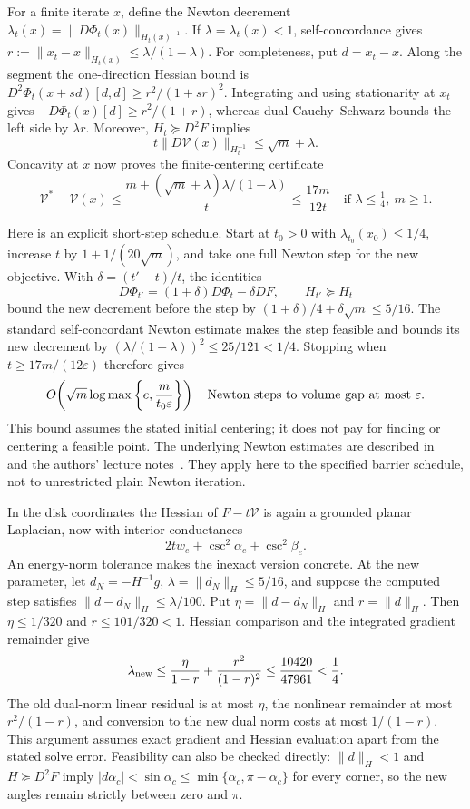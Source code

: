 For a finite iterate $x$, define the Newton decrement
$\lambda_t(x)=\|D\Phi_t(x)\|_{H_t(x)^{-1}}$. If $\lambda=\lambda_t(x)<1$,
self-concordance gives
$r:=\|x_t-x\|_{H_t(x)}\le\lambda/(1-\lambda)$.
For completeness, put $d=x_t-x$. Along the segment the one-direction
Hessian bound is
$D^2\Phi_t(x+s d)[d,d]\ge r^2/(1+s r)^2$.
Integrating and using stationarity at $x_t$ gives
$-D\Phi_t(x)[d]\ge r^2/(1+r)$, whereas dual Cauchy--Schwarz bounds
the left side by $\lambda r$. Moreover, $H_t\succeq D^2F$ implies
\[
 t\|D\mathcal V(x)\|_{H_t^{-1}}\le\sqrt m+\lambda.
\]
Concavity at $x$ now proves the finite-centering certificate
\[
 \mathcal V^*-\mathcal V(x)
 \le\frac{m+(\sqrt m+\lambda)\lambda/(1-\lambda)}{t}
 \le\frac{17m}{12t}\quad\text{if }\lambda\le\tfrac14,\ m\ge1.
\]

Here is an explicit short-step schedule. Start at $t_0>0$ with
$\lambda_{t_0}(x_0)\le1/4$, increase $t$ by
$1+1/(20\sqrt m)$, and take one full Newton step for the new objective.
With $\delta=(t'-t)/t$, the identities
\[
 D\Phi_{t'}=(1+\delta)D\Phi_t-\delta DF,
 \qquad H_{t'}\succeq H_t
\]
bound the new decrement before the step by
$(1+\delta)/4+\delta\sqrt m\le5/16$.
The standard self-concordant Newton estimate makes the step feasible
and bounds its new decrement by
$(\lambda/(1-\lambda))^2\le25/121<1/4$.
Stopping when $t\ge17m/(12\varepsilon)$ therefore gives
\begin{equation}
 O\!\left(\sqrt m\log\max\left\{e,\frac{m}{t_0\varepsilon}\right\}\right)
 \quad\hbox{Newton steps to volume gap at most }\varepsilon.
 \label{eq:ipolyStepBound}
\end{equation}
This bound assumes the stated initial centering; it does not pay for
finding or centering a feasible point. The underlying Newton estimates
are described in~\cite[Chapter~11]{BoydVandenberghe} and the authors'
lecture notes~\cite{BoydVandenbergheSlides}. They apply here to the
specified barrier schedule, not to unrestricted plain Newton iteration.

In the disk coordinates the Hessian of $F-t\mathcal V$ is again a
grounded planar Laplacian, now with interior conductances
\[
 2t w_e+\csc^2\alpha_e+\csc^2\beta_e.
\]
An energy-norm tolerance makes the inexact version concrete. At the new
parameter, let $d_N=-H^{-1}g$, $\lambda=\|d_N\|_H\le5/16$, and suppose
the computed step satisfies $\|d-d_N\|_H\le\lambda/100$.
Put $\eta=\|d-d_N\|_H$ and $r=\|d\|_H$. Then
$\eta\le1/320$ and $r\le101/320<1$. Hessian comparison and the
integrated gradient remainder give
\[
 \lambda_{\rm new}
 \le\frac{\eta}{1-r}+\frac{r^2}{(1-r)^2}
 \le\frac{10420}{47961}<\frac14.
\]
The old dual-norm linear residual is at most $\eta$, the nonlinear
remainder at most $r^2/(1-r)$, and conversion to the new dual norm
costs at most $1/(1-r)$. This argument assumes exact gradient and
Hessian evaluation apart from the stated solve error. Feasibility can
also be checked directly: $\|d\|_H<1$ and $H\succeq D^2F$ imply
$|d\alpha_c|<\sin\alpha_c\le\min\{\alpha_c,\pi-\alpha_c\}$ for
every corner, so the new angles remain strictly between zero and $\pi$.

